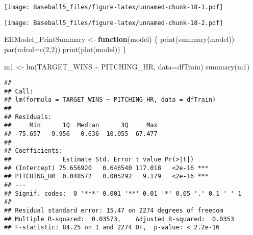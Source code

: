 \documentclass[
]{article}
\newenvironment{Shaded}{\begin{snugshade}}{\end{snugshade}}
\newcommand{\AttributeTok}[1]{\textcolor[rgb]{0.77,0.63,0.00}{#1}}
\newcommand{\ControlFlowTok}[1]{\textcolor[rgb]{0.13,0.29,0.53}{\textbf{#1}}}
\newcommand{\DecValTok}[1]{\textcolor[rgb]{0.00,0.00,0.81}{#1}}
\newcommand{\FunctionTok}[1]{\textcolor[rgb]{0.00,0.00,0.00}{#1}}
\newcommand{\NormalTok}[1]{#1}
\newcommand{\OtherTok}[1]{\textcolor[rgb]{0.56,0.35,0.01}{#1}}
\newcommand{\SpecialCharTok}[1]{\textcolor[rgb]{0.00,0.00,0.00}{#1}}
\begin{document}
\begin{Shaded}
\end{Shaded}

\texttt{[image: Baseball5\_files/figure-latex/unnamed-chunk-18-1.pdf]}

\begin{Shaded}
\end{Shaded}

\texttt{[image: Baseball5\_files/figure-latex/unnamed-chunk-18-2.pdf]}

\begin{Shaded}
\begin{Highlighting}[]
\NormalTok{EHModel\_PrintSummary }\OtherTok{\textless{}{-}} \ControlFlowTok{function}\NormalTok{(model)}
\NormalTok{\{}
  \FunctionTok{print}\NormalTok{(}\FunctionTok{summary}\NormalTok{(model))}
  \FunctionTok{par}\NormalTok{(}\AttributeTok{mfcol=}\FunctionTok{c}\NormalTok{(}\DecValTok{2}\NormalTok{,}\DecValTok{2}\NormalTok{))}
  \FunctionTok{print}\NormalTok{(}\FunctionTok{plot}\NormalTok{(model))}
\NormalTok{\}}

\NormalTok{m1 }\OtherTok{\textless{}{-}} \FunctionTok{lm}\NormalTok{(TARGET\_WINS }\SpecialCharTok{\textasciitilde{}}\NormalTok{ PITCHING\_HR, }\AttributeTok{data=}\NormalTok{dfTrain)}
\FunctionTok{summary}\NormalTok{(m1)}
\end{Highlighting}
\end{Shaded}

\begin{verbatim}
## 
## Call:
## lm(formula = TARGET_WINS ~ PITCHING_HR, data = dfTrain)
## 
## Residuals:
##     Min      1Q  Median      3Q     Max 
## -75.657  -9.956   0.636  10.055  67.477 
## 
## Coefficients:
##              Estimate Std. Error t value Pr(>|t|)    
## (Intercept) 75.656920   0.646540 117.018   <2e-16 ***
## PITCHING_HR  0.048572   0.005292   9.179   <2e-16 ***
## ---
## Signif. codes:  0 '***' 0.001 '**' 0.01 '*' 0.05 '.' 0.1 ' ' 1
## 
## Residual standard error: 15.47 on 2274 degrees of freedom
## Multiple R-squared:  0.03573,    Adjusted R-squared:  0.0353 
## F-statistic: 84.25 on 1 and 2274 DF,  p-value: < 2.2e-16
\end{verbatim}
\end{document}
